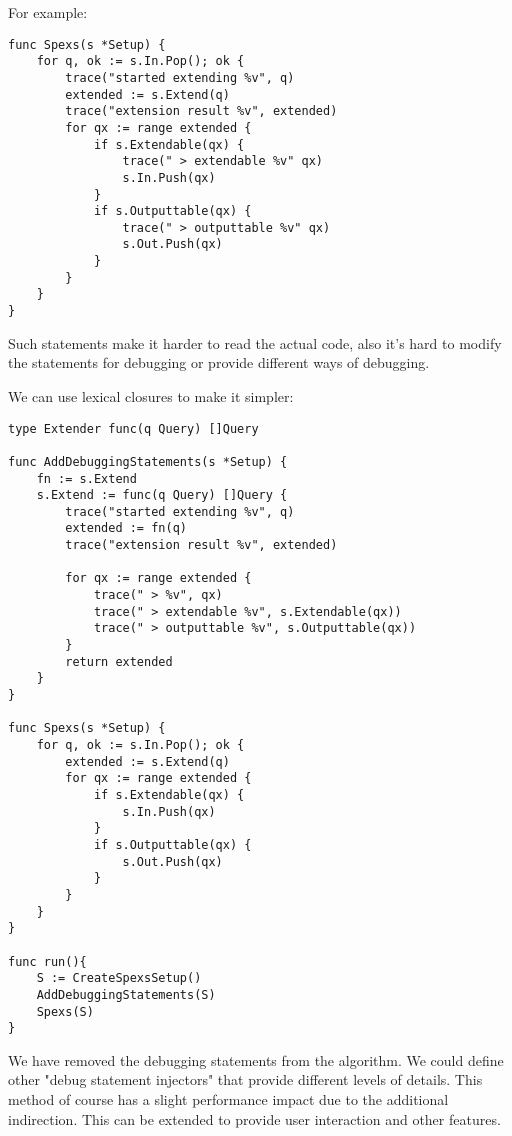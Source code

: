 For example:

\begin{lstlisting}
func Spexs(s *Setup) {
    for q, ok := s.In.Pop(); ok {
        trace("started extending %v", q)
        extended := s.Extend(q)
        trace("extension result %v", extended)
        for qx := range extended {
            if s.Extendable(qx) {
                trace(" > extendable %v" qx)
                s.In.Push(qx)
            }
            if s.Outputtable(qx) {
                trace(" > outputtable %v" qx)
                s.Out.Push(qx)
            }
        }
    }
}
\end{lstlisting}

Such statements make it harder to read the actual code, also it's hard to modify the statements for debugging or provide different ways of debugging.

We can use lexical closures to make it simpler:

\begin{lstlisting}
type Extender func(q Query) []Query

func AddDebuggingStatements(s *Setup) {
    fn := s.Extend
    s.Extend := func(q Query) []Query {
        trace("started extending %v", q)
        extended := fn(q)
        trace("extension result %v", extended)
        
        for qx := range extended {
            trace(" > %v", qx)
            trace(" > extendable %v", s.Extendable(qx))
            trace(" > outputtable %v", s.Outputtable(qx))
        }
        return extended
    }
}

func Spexs(s *Setup) {
    for q, ok := s.In.Pop(); ok {
        extended := s.Extend(q)
        for qx := range extended {
            if s.Extendable(qx) {
                s.In.Push(qx)
            }
            if s.Outputtable(qx) {
                s.Out.Push(qx)
            }
        }
    }
}

func run(){
    S := CreateSpexsSetup()
    AddDebuggingStatements(S)
    Spexs(S)
}
\end{lstlisting}

We have removed the debugging statements from the algorithm. We could define other "debug statement injectors" that provide different levels of details. This method of course has a slight performance impact due to the additional indirection. This can be extended to provide user interaction and other features.